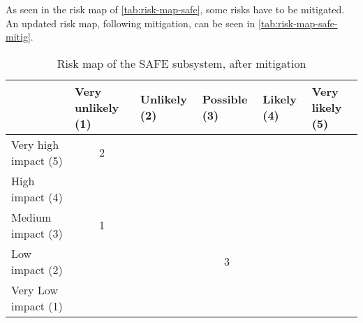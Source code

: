 As seen in the risk map of \autoref{tab:risk-map-safe}, some risks have to be mitigated. 		An updated risk map, following mitigation, can be seen in \autoref{tab:risk-map-safe-mitig}.

\begin{table}[H]
\centering
\caption{Risk map of the SAFE subsystem, after mitigation}
\label{tab:risk-map-safe-mitig}\begin{tabular}{l|c|c|c|c|c|}
\cline{2-6}
& \multicolumn{1}{l|}{Very unlikely (1)} & \multicolumn{1}{l|}{Unlikely (2)} & \multicolumn{1}{l|}{Possible (3)} & \multicolumn{1}{l|}{Likely (4)} & \multicolumn{1}{l|}{Very likely (5)} \\ \hline
\multicolumn{1}{|l|}{Very high impact (5)} & \cellcolor{rm-3}2 & \cellcolor{rm-3} & \cellcolor{rm-3} & \cellcolor{rm-3} & \cellcolor{rm-3}\\ \hline 
\multicolumn{1}{|l|}{High impact (4)} & \cellcolor{rm-2} & \cellcolor{rm-2} & \cellcolor{rm-2} & \cellcolor{rm-3} & \cellcolor{rm-3}\\ \hline 
\multicolumn{1}{|l|}{Medium impact (3)} & \cellcolor{rm-0}1 & \cellcolor{rm-1} & \cellcolor{rm-1} & \cellcolor{rm-2} & \cellcolor{rm-3}\\ \hline 
\multicolumn{1}{|l|}{Low impact (2)} & \cellcolor{rm-0} & \cellcolor{rm-0} & \cellcolor{rm-1}3 & \cellcolor{rm-2} & \cellcolor{rm-3}\\ \hline 
\multicolumn{1}{|l|}{Very Low impact (1)} & \cellcolor{rm-0} & \cellcolor{rm-0} & \cellcolor{rm-0} & \cellcolor{rm-2} & \cellcolor{rm-3}\\ \hline 
\end{tabular} 
\end{table}

